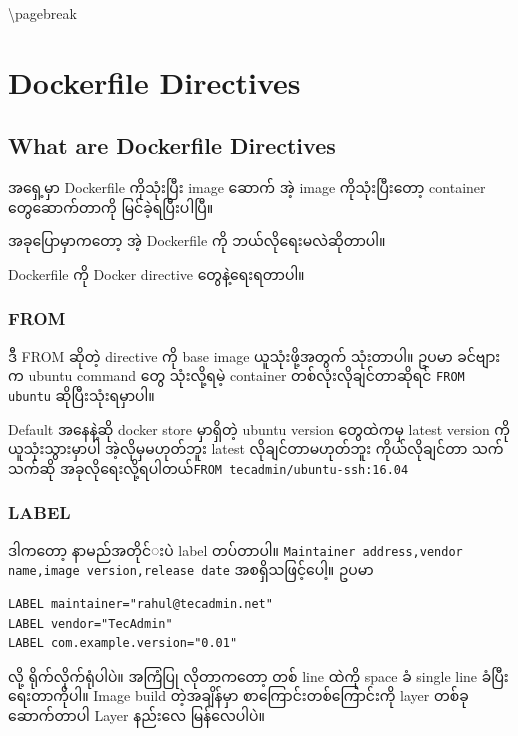 \textbackslash{}pagebreak

\section{Dockerfile Directives}\label{dockerfile-directives}

\subsection{What are Dockerfile
Directives}\label{what-are-dockerfile-directives}

အ​ရှေ့မှာ Dockerfile ကိုသုံးပြီး image ​ဆောက်​ အဲ့ image
ကိုသုံးပြီး​တော့ container ​တွေ ​ဆောက်​တာကို မြင်​ခဲ့ရပြီးပါပြီ။

အခု​ပြောမှာက​တော့ အဲ့ Dockerfile ကို ဘယ်​လို​ရေးမလဲဆိုတာပါ။

Dockerfile ကို Docker directive ​တွေနဲ့​ရေးရတာပါ။

\subsubsection{FROM}\label{from}

ဒီ FROM ဆိုတဲ့ directive ကို base image ယူသုံးဖို့အတွက်​ သုံးတာပါ။ ဥပမာ
ခင်​​ဗျားက ubuntu command ​တွေ သုံးလို့ရမဲ့ container
တစ်​လုံးလိုချင်​တာဆိုရင်​ \texttt{FROM ubuntu} ဆိုပြီးသုံးရမှာပါ။

Default အ​နေနဲ့ဆို docker store မှာရှိတဲ့ ubuntu version ​တွေထဲကမှ
latest version ကို ယူသုံးသွားမှာပါ အဲ့လိုမှမဟုတ်​ဘူး latest
လိုချင်​တာမဟုတ်​ဘူး ကိုယ်​လိုချင်​တာ သက်​သက်​ဆို အခုလို​ရေးလို့ရပါတယ်​
\texttt{FROM tecadmin/ubuntu-ssh:16.04}

\subsubsection{LABEL}\label{label}

ဒါက​တော့ နာမည်​အတိုင်​းပဲ label တပ်​တာပါ။
\texttt{Maintainer addres​s,vendor name,image version,release date}
အစရှိသဖြင့်​ပေါ့။ ဥပမာ

\begin{verbatim}
LABEL maintainer="rahul@tecadmin.net"
LABEL vendor="TecAdmin"
LABEL com.example.version="0.01"
\end{verbatim}

လို့ ရိုက်​လိုက်​ရုံပါပဲ။ အကြံပြု လိုတာက​တော့ တစ်​ line ထဲကို space ခံ
single line ခံပြီး ​ရေးတာကိုပါ။ Image build တဲ့အချိန်​မှာ
စာ​ကြောင်းတစ်​​ကြောင်းကို layer တစ်​ခု ​ဆောက်​တာပါ Layer နည်း​လေ
မြန်​​လေပါပဲ။

